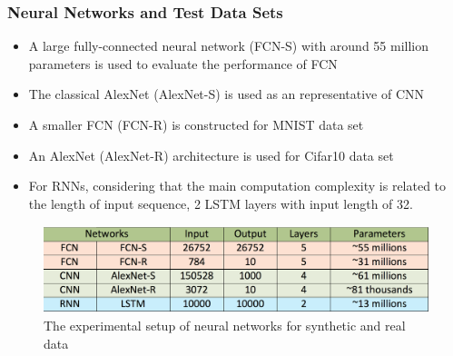 \begin{frame}
  \MyLogo
  \frametitle{Neural Networks and Test Data Sets}  

\medskip

\begin{itemize}

\item A large fully-connected neural network (\alert{FCN-S}) with around 55 million parameters is used to evaluate the performance of FCN

\item The classical AlexNet (\alert{AlexNet-S}) is used as an representative of CNN

\item A smaller FCN (\alert{FCN-R}) is constructed for MNIST data set

\item An AlexNet (\alert{AlexNet-R}) architecture is used for Cifar10 data set

\item For RNNs, considering that the main computation complexity is related to the length of input sequence, 2 LSTM layers with input length of 32.

\end{itemize}

\begin{figure}[htbp] 
\includegraphics[height=1in]{figures/models.png} 
\caption{The experimental setup of neural networks for synthetic and real data}
\end{figure}
	
\end{frame}

